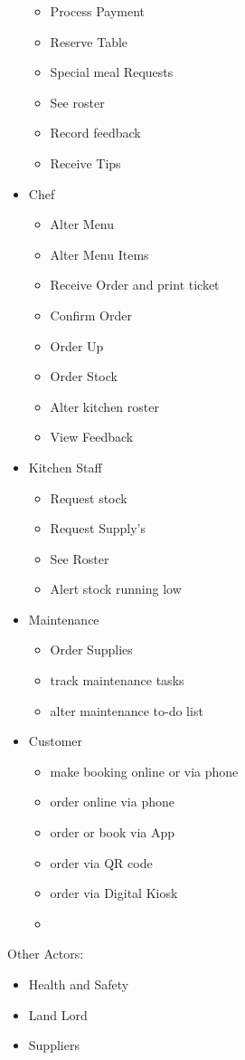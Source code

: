 \documentclass{article}
\begin{document}
\begin{itemize}
\begin{itemize}
        \item {Process Payment}
        \item {Reserve Table}
        \item {Special meal Requests}
        \item See roster
        \item Record feedback
        \item Receive Tips
    \end{itemize}
    \item {Chef}
    \begin{itemize}
        \item Alter Menu
        \item Alter Menu Items
        \item Receive Order and print ticket
        \item Confirm Order
        \item Order Up
        \item Order Stock
        \item Alter kitchen roster
        \item View Feedback
    \end{itemize}
    \item {Kitchen Staff}
    \begin{itemize}
        \item Request stock
        \item Request Supply's
        \item See Roster
        \item Alert stock running low
    \end{itemize}
    \item {Maintenance}
    \begin{itemize}
        \item Order Supplies
        \item track maintenance tasks
        \item alter maintenance to-do list
    \end{itemize}
    \item {Customer}
    \begin{itemize}
        \item make booking online or via phone
        \item order online via phone
        \item order or book via App
        \item order via QR code
        \item order via Digital Kiosk
        \item 
    \end{itemize}
\end{itemize}
Other Actors:
\begin{itemize}
    \item {Health and Safety}
    \item {Land Lord}
    \item {Suppliers}
\end{itemize}
\end{document}
